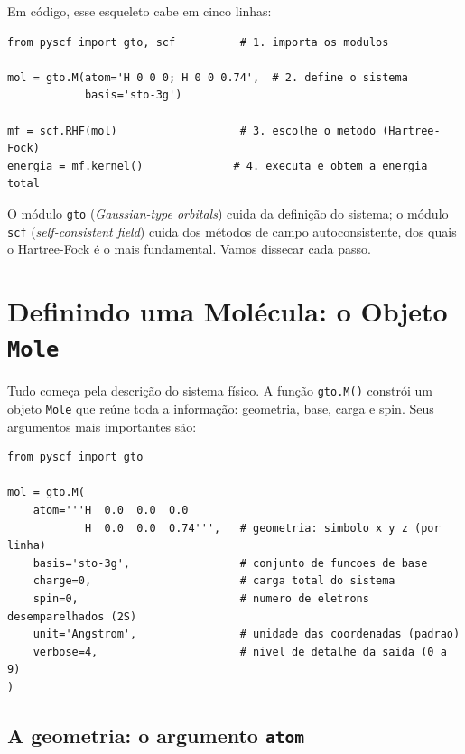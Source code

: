 \documentclass[11pt,a4paper,openany]{book}
\newcommand{\code}[1]{\texttt{#1}}
\begin{document}
\noindent
Em código, esse esqueleto cabe em cinco linhas:

\begin{lstlisting}[style=python,caption={O esqueleto de qualquer cálculo PySCF.},label={lst:esqueleto}]
from pyscf import gto, scf          # 1. importa os modulos

mol = gto.M(atom='H 0 0 0; H 0 0 0.74',  # 2. define o sistema
            basis='sto-3g')

mf = scf.RHF(mol)                   # 3. escolhe o metodo (Hartree-Fock)
energia = mf.kernel()              # 4. executa e obtem a energia total
\end{lstlisting}

\noindent
O módulo \code{gto} (\emph{Gaussian-type orbitals}) cuida da definição do sistema;
o módulo \code{scf} (\emph{self-consistent field}) cuida dos métodos de campo
autoconsistente, dos quais o Hartree-Fock é o mais fundamental. Vamos dissecar
cada passo.

\section{Definindo uma Molécula: o Objeto \code{Mole}}
\label{sec:mole}

Tudo começa pela descrição do sistema físico. A função \code{gto.M()} constrói um
objeto \code{Mole} que reúne toda a informação: geometria, base, carga e spin. Seus
argumentos mais importantes são:

\begin{lstlisting}[style=python,caption={Os argumentos essenciais de \code{gto.M}.},label={lst:moleargs}]
from pyscf import gto

mol = gto.M(
    atom='''H  0.0  0.0  0.0
            H  0.0  0.0  0.74''',   # geometria: simbolo x y z (por linha)
    basis='sto-3g',                 # conjunto de funcoes de base
    charge=0,                       # carga total do sistema
    spin=0,                         # numero de eletrons desemparelhados (2S)
    unit='Angstrom',                # unidade das coordenadas (padrao)
    verbose=4,                      # nivel de detalhe da saida (0 a 9)
)
\end{lstlisting}

\subsection{A geometria: o argumento \code{atom}}
\end{document}
